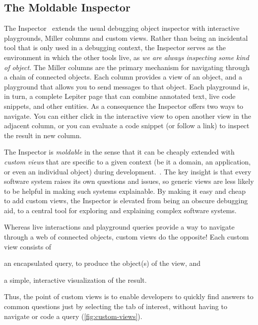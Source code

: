 \documentclass[conference]{IEEEtran}
\newcommand\tg[1]{\nbc{TG}{#1}{orange}} %
\begin{document}
\subsection{The Moldable Inspector}


The Inspector~\cite{Chis15a} extends the usual debugging object inspector with interactive playgrounds, Miller columns and custom views.
Rather than being an incidental tool that is only used in a debugging context, the Inspector serves as the environment in which the other tools live, as \emph{we are always inspecting some kind of object}.
The Miller columns are the primary mechanism for navigating through a chain of connected objects.
Each column provides a view of an object, and a playground that allows you to send messages to that object. 
Each playground is, in turn, a complete Lepiter page that can combine annotated text, live code snippets, and other entities.
As a consequence the Inspector offers two ways to navigate.
You can either click in the interactive view to open another view in the adjacent column, or you can evaluate a code snippet (or follow a link) to inspect the result in new column.

The Inspector is \emph{moldable} in the sense that it can be cheaply extended with \emph{custom views} that are specific to a given context (be it a domain, an application, or even an individual object) during development.~\cite{Chis17a,Chis16b}.
The key insight is that every software system raises its own questions and issues, so generic views are less likely to be helpful in making such systems explainable.
By making it easy and cheap to add custom views, the Inspector is elevated from being an obscure debugging aid, to a central tool for exploring and explaining complex software systems.

Whereas live interactions and playground queries provide a way to navigate through a web of connected objects, custom views do the opposite!
Each custom view consists of 
\begin{inparaenum}[(i)]
\item an encapsulated query, to produce the object(s) of the view, and
\item a simple, interactive visualization of the result.
\end{inparaenum}
Thus, the point of custom views is to enable developers to quickly find answers to common questions just by selecting the tab of interest, without having to navigate or code a query (\autoref{fig:custom-views}).
\end{document}
